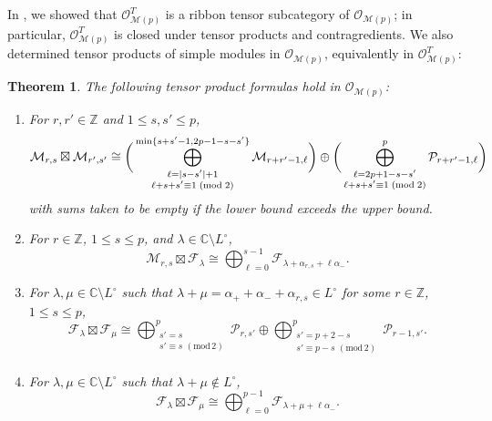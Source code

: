 \documentclass[11pt, reqno]{amsart}
\newtheorem{thm}{Theorem}[section]
\theoremstyle{definition}\newtheorem{defi}[thm]{Definition}
\theoremstyle{definition}\newtheorem{rem}[thm]{Remark}
\theoremstyle{definition}\newtheorem{exam}[thm]{Example}
\theoremstyle{definition}\newtheorem{assum}[thm]{Assumption}
\newcommand{\cM}{\mathcal{M}}
\newcommand{\cF}{\mathcal{F}}
\newcommand{\cO}{\mathcal{O}}
\newcommand{\cP}{\mathcal{P}}
\newcommand{\CC}{\mathbb{C}}
\newcommand{\ZZ}{\mathbb{Z}}
\newcommand{\tens}{\boxtimes}
\begin{document}
In \cite{CMY-singlet, CMY-singlet-typical}, we showed that $\cO_{\cM(p)}^T$ is a ribbon tensor subcategory of $\cO_{\cM(p)}$; in particular, $\cO_{\cM(p)}^T$ is closed under tensor products and contragredients. We also determined tensor products of simple modules in $\cO_{\cM(p)}$, equivalently in $\cO_{\cM(p)}^T$:

\begin{thm}\label{thm:singlet_fus_rules}
 The following tensor product formulas hold in $\cO_{\cM(p)}$:
 \begin{enumerate}

\item For $r,r'\in\ZZ$ and $1\leq s, s'\leq p$,
  \begin{equation*}
   \cM_{r,s}\boxtimes \cM_{r',s'}   \cong\bigg(\bigoplus_{\substack{\ell = |s-s'|+1 \\ \ell+s+s' \equiv 1\; (\mathrm{mod}\; 2)}}^{{\rm min}\{s+s'-1, 2p-1-s-s'\}}\cM_{r+r'-1, \ell}\bigg) \oplus \bigg(\bigoplus_{\substack{\ell = 2p+1-s-s'\\ \ell+s+s' \equiv 1\; (\mathrm{mod}\; 2)}}^{p}\cP_{r+r'-1, \ell}\bigg)
  \end{equation*}
with sums taken to be empty if the lower bound exceeds the upper bound. 
 
  \item 
  For $r\in\ZZ$, $1\leq s\leq p$, and $\lambda\in\CC\setminus L^\circ$, 
 \begin{equation*}
  \cM_{r,s}\tens\cF_\lambda\cong\bigoplus_{\ell=0}^{s-1} \cF_{\lambda+\alpha_{r,s}+\ell\alpha_-}.
 \end{equation*}
  
  
  \item
  For $\lambda,\mu\in\CC\setminus L^\circ$ such that $\lambda+\mu =\alpha_++\alpha_-+\alpha_{r,s}\in L^\circ$ for some $r\in\ZZ$, $1\leq s\leq p$,
  \begin{equation*}
  \cF_\lambda\tens\cF_{\mu}\cong\bigoplus_{\substack{s'= s\\ s'\equiv s\,\,(\mathrm{mod}\,2)\\}}^p \cP_{r,s'}\oplus\bigoplus_{\substack{s'=p+2-s\\s'\equiv p-s\,\,(\mathrm{mod}\,2)\\}}^p \cP_{r-1,s'}.
 \end{equation*}
  
  
  \item
  For $\lambda,\mu\in\CC\setminus L^\circ$ such that $\lambda+\mu\notin L^\circ$,
\begin{equation*}
\cF_{\lambda}\tens\cF_\mu \cong \bigoplus_{\ell=0}^{p-1} \cF_{\lambda + \mu + \ell \alpha_-}.
\end{equation*}
 \end{enumerate}
 \end{thm}
 
\end{document}
